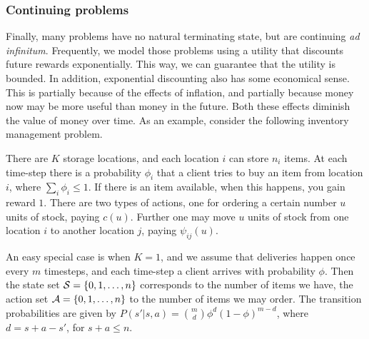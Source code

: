 \subsubsection{Continuing problems}
Finally, many problems have no natural terminating state, but are continuing \emph{ad infinitum}. Frequently, we model those problems using a utility that discounts future rewards exponentially. This way, we can guarantee that the utility is bounded. In addition, exponential discounting also has some economical sense. This is partially because of the effects of inflation, and partially because money now may be more useful than money in the future. Both these effects diminish the value of money over time.  As an example, consider the following inventory management problem. 

\begin{example}
  There are $K$ storage locations, and each location $i$ can store
  $n_i$ items.  At each time-step there is a probability $\phi_i$ that
  a client tries to buy an item from location $i$, where $\sum_i
  \phi_i \leq 1$.  If there is an item available, when this happens,
  you gain reward $1$.  There are two types of actions, one for
  ordering a certain number $u$ units of stock, paying $c(u)$.
  Further one may move $u$ units of stock from one location $i$ to
  another location $j$, paying $\psi_{ij}(u)$.
\end{example}

An easy special case is when $K=1$, and we assume that deliveries
happen once every $m$ timesteps, and each time-step a client arrives
with probability $\phi$.  Then the state set ${\mathcal{S}}=\{0, 1, \ldots, n
\}$ corresponds to the number of items we have, the action set
${\mathcal{A}}=\{0, 1, \ldots, n\}$ to the number of items we may order.  The
transition probabilities are given by $P(s'|s,a) =
\binom{m}{d}\phi^d(1-\phi)^{m-d}$, where $d=s+a-s'$, for $s+a \leq n$.


\newcommand{\Node}[3]{%
  \pgfnodecircle{#1}[stroke]{#2}{0.3cm}%
  \pgfputat{\pgfrelative{#2}{\pgfxy(0,-.075)}}{\pgfbox[center,base]{#3}}}

\newcommand{\SNode}[3]{%
  \pgfnodebox{#1}[stroke]{#2}{0.3cm}%
  \pgfputat{\pgfrelative{#2}{\pgfxy(0,-.075)}}{\pgfbox[center,base]{#3}}}

\newcommand{\BNode}[3]{%
  \pgfnodecircle{#1}[stroke]{#2}{0.4cm}%
  \pgfputat{\pgfrelative{#2}{\pgfxy(0,-.075)}}{\pgfbox[center,base]{#3}}}

